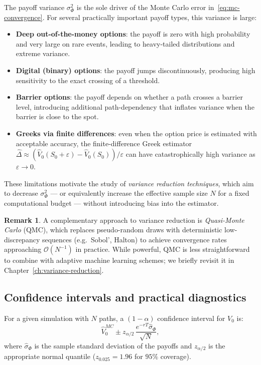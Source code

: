 \documentclass[12pt, a4paper]{report}
\theoremstyle{definition}
\newtheorem{remark}{Remark}[chapter]
\begin{document}
The payoff variance $\sigma_\Phi^2$ is the sole driver of the Monte
Carlo error in~\eqref{eq:mc-convergence}.  For several practically
important payoff types, this variance is large:

\begin{itemize}
  \item \textbf{Deep out-of-the-money options}: the payoff is zero with
        high probability and very large on rare events, leading to
        heavy-tailed distributions and extreme variance.
  \item \textbf{Digital (binary) options}: the payoff jumps
        discontinuously, producing high sensitivity to the exact
        crossing of a threshold.
  \item \textbf{Barrier options}: the payoff depends on whether a path
        crosses a barrier level, introducing additional path-dependency
        that inflates variance when the barrier is close to the spot.
  \item \textbf{Greeks via finite differences}: even when the option
        price is estimated with acceptable accuracy, the
        finite-difference Greek estimator
        $\hat{\Delta} \approx (\hat{V}_0(S_0 + \varepsilon) -
        \hat{V}_0(S_0))/\varepsilon$ can have catastrophically high
        variance as $\varepsilon \to 0$.
\end{itemize}

These limitations motivate the study of \emph{variance reduction
techniques}, which aim to decrease $\sigma_\Phi^2$ --- or equivalently
increase the effective sample size $N$ for a fixed computational budget
--- without introducing bias into the estimator.

\begin{remark}
A complementary approach to variance reduction is \emph{Quasi-Monte
Carlo} (QMC), which replaces pseudo-random draws with deterministic
low-discrepancy sequences (e.g.\ Sobol', Halton) to achieve convergence
rates approaching $\mathcal{O}(N^{-1})$ in practice.  While powerful,
QMC is less straightforward to combine with adaptive machine learning
schemes; we briefly revisit it in Chapter~\ref{ch:variance-reduction}.
\end{remark}

\subsection{Confidence intervals and practical diagnostics}

For a given simulation with $N$ paths, a $(1-\alpha)$ confidence
interval for $V_0$ is:
\[
  \hat{V}_0^{MC} \pm z_{\alpha/2}\,\frac{e^{-rT}\hat{\sigma}_\Phi}{\sqrt{N}},
\]
where $\hat{\sigma}_\Phi$ is the sample standard deviation of the
payoffs and $z_{\alpha/2}$ is the appropriate normal quantile
($z_{0.025} = 1.96$ for $95\%$ coverage).
\end{document}
